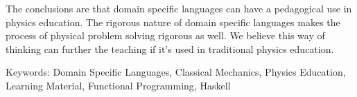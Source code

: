 The conclusions are that domain specific languages can have a pedagogical use in
physics education. The rigorous nature of domain specific languages
makes the process of physical problem solving rigorous as well. We believe this
way of thinking can further the teaching if it's used in traditional physics
education.













\vfill
Keywords: Domain Specific Languages, Classical Mechanics, Physics Education, Learning Material, Functional Programming, Haskell


\newpage				%
\thispagestyle{empty}
\mbox{}
